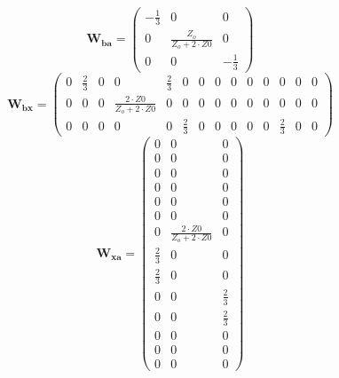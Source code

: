 \[ \mathbf{W_{ba}} = \left(\begin{smallmatrix} -\frac{1}{3} & 0 & 0 \\
0 & \frac{Z_o}{Z_o+2\cdot Z0} & 0 \\ 0 & 0 & -\frac{1}{3}
\end{smallmatrix}\right) \]
\[ \mathbf{W_{bx}} = \left(\begin{smallmatrix} 0 & \frac{2}{3} & 0 & 0
& \frac{2}{3} & 0 & 0 & 0 & 0 & 0 & 0 & 0 & 0 & 0 \\ 0 & 0 & 0 &
\frac{2\cdot Z0}{Z_o+2\cdot Z0} & 0 & 0 & 0 & 0 & 0 & 0 & 0 & 0 & 0 &
0 \\ 0 & 0 & 0 & 0 & 0 & \frac{2}{3} & 0 & 0 & 0 & 0 & 0 & \frac{2}{3}
& 0 & 0 \end{smallmatrix}\right) \]
\[ \mathbf{W_{xa}} = \left(\begin{smallmatrix} 0 & 0 & 0 \\ 0 & 0 & 0
\\ 0 & 0 & 0 \\ 0 & 0 & 0 \\ 0 & 0 & 0 \\ 0 & 0 & 0 \\ 0 &
\frac{2\cdot Z0}{Z_o+2\cdot Z0} & 0 \\ \frac{2}{3} & 0 & 0 \\
\frac{2}{3} & 0 & 0 \\ 0 & 0 & \frac{2}{3} \\ 0 & 0 & \frac{2}{3} \\ 0
& 0 & 0 \\ 0 & 0 & 0 \\ 0 & 0 & 0 \end{smallmatrix}\right) \]
